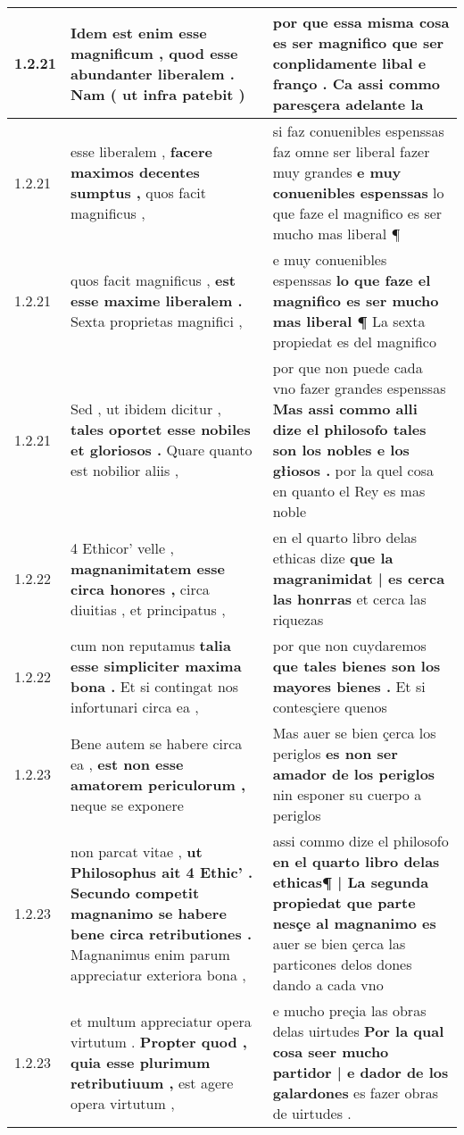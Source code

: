 \begin{tabular}{|p{1cm}|p{6.5cm}|p{6.5cm}|}
1.2.21 & Idem est enim esse magnificum , \textbf{ quod esse abundanter liberalem . } Nam ( ut infra patebit ) & por que essa misma cosa es ser magnifico \textbf{ que ser conplidamente libal e franço . } Ca assi commo paresçera adelante la \\\hline
1.2.21 & esse liberalem , \textbf{ facere maximos decentes sumptus , } quos facit magnificus , & si faz conuenibles espenssas faz omne ser liberal fazer muy grandes \textbf{ e muy conuenibles espenssas } lo que faze el magnifico es ser mucho mas liberal ¶ \\\hline
1.2.21 & quos facit magnificus , \textbf{ est esse maxime liberalem . } Sexta proprietas magnifici , & e muy conuenibles espenssas \textbf{ lo que faze el magnifico es ser mucho mas liberal ¶ } La sexta propiedat es del magnifico \\\hline
1.2.21 & Sed , ut ibidem dicitur , \textbf{ tales oportet esse nobiles et gloriosos . } Quare quanto est nobilior aliis , & por que non puede cada vno fazer grandes espenssas \textbf{ Mas assi commo alli dize el philosofo tales son los nobles e los głiosos . } por la quel cosa en quanto el Rey es mas noble \\\hline
1.2.22 & 4 Ethicor’ velle , \textbf{ magnanimitatem esse circa honores , } circa diuitias , et principatus , & en el quarto libro delas ethicas dize \textbf{ que la magranimidat | es cerca las honrras } et cerca las riquezas \\\hline
1.2.22 & cum non reputamus \textbf{ talia esse simpliciter maxima bona . } Et si contingat nos infortunari circa ea , & por que non cuydaremos \textbf{ que tales bienes son los mayores bienes . } Et si contesçiere quenos \\\hline
1.2.23 & Bene autem se habere circa ea , \textbf{ est non esse amatorem periculorum , } neque se exponere & Mas auer se bien çerca los periglos \textbf{ es non ser amador de los periglos } nin esponer su cuerpo a periglos \\\hline
1.2.23 & non parcat vitae , \textbf{ ut Philosophus ait 4 Ethic’ . Secundo competit magnanimo se habere bene circa retributiones . } Magnanimus enim parum appreciatur exteriora bona , & assi commo dize el philosofo \textbf{ en el quarto libro delas ethicas¶ | La segunda propiedat que parte nesçe al magnanimo es } auer se bien çerca las particones delos dones dando a cada vno \\\hline
1.2.23 & et multum appreciatur opera virtutum . \textbf{ Propter quod , quia esse plurimum retributiuum , } est agere opera virtutum , & e mucho preçia las obras delas uirtudes \textbf{ Por la qual cosa seer mucho partidor | e dador de los galardones } es fazer obras de uirtudes . \\\hline

\end{tabular}
